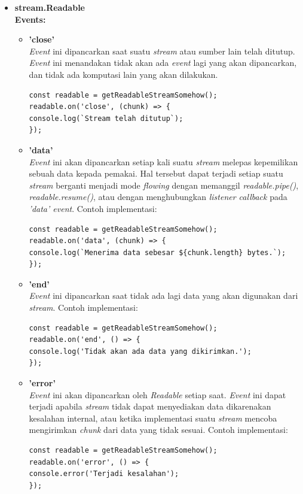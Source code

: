 \documentclass[a4paper,twoside]{article}
\begin{document}
\begin{enumerate}
\begin{enumerate}
\begin{enumerate}
				\begin{itemize}
					\item \textbf{stream.Readable} \\
					\textbf{Events:}
					\begin{itemize}
						\item \textbf{'close'} \\ \textit{Event} ini dipancarkan saat suatu \textit{stream} atau sumber lain telah ditutup. \textit{Event} ini menandakan tidak akan ada \textit{event} lagi yang akan dipancarkan, dan tidak ada komputasi lain yang akan dilakukan.
\begin{lstlisting}
const readable = getReadableStreamSomehow();
readable.on('close', (chunk) => {
console.log(`Stream telah ditutup`);
});
\end{lstlisting}
						
						\item \textbf{'data'} \\ \textit{Event} ini akan dipancarkan setiap kali suatu \textit{stream} melepas kepemilikan sebuah data kepada pemakai. Hal tersebut dapat terjadi setiap suatu \textit{stream} berganti menjadi mode \textit{flowing} dengan memanggil \textit{readable.pipe()}, \textit{readable.resume()}, atau dengan menghubungkan \textit{listener callback} pada \textit{'data' event}. Contoh implementasi:
\begin{lstlisting}
const readable = getReadableStreamSomehow();
readable.on('data', (chunk) => {
console.log(`Menerima data sebesar ${chunk.length} bytes.`);
});
\end{lstlisting}
						
						\item \textbf{'end'} \\ \textit{Event} ini dipancarkan saat tidak ada lagi data yang akan digunakan dari \textit{stream}. Contoh implementasi:
\begin{lstlisting}
const readable = getReadableStreamSomehow();
readable.on('end', () => {
console.log('Tidak akan ada data yang dikirimkan.');
});
\end{lstlisting}
						
						\item \textbf{'error'} \\ \textit{Event} ini akan dipancarkan oleh \textit{Readable} setiap saat. \textit{Event} ini dapat terjadi apabila \textit{stream} tidak dapat menyediakan data dikarenakan kesalahan internal, atau ketika implementasi suatu \textit{stream} mencoba mengirimkan \textit{chunk} dari data yang tidak sesuai. Contoh implementasi:
\begin{lstlisting}
const readable = getReadableStreamSomehow();
readable.on('error', () => {
console.error('Terjadi kesalahan');
});
\end{lstlisting}
						

\end{itemize}
\end{itemize}
\end{enumerate}
\end{enumerate}
\end{enumerate}
\end{document}
